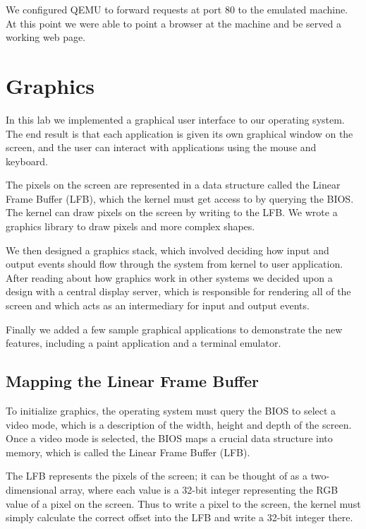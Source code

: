 \documentclass{report}
\begin{document}
We configured QEMU to forward requests at port 80 to the emulated machine. At
this point we were able to point a browser at the machine and be served a
working web page.







\chapter{Graphics}
\label{sec:graphics}

In this lab we implemented a graphical user interface to our operating system.
The end result is that each application is given its own graphical window on
the screen, and the user can interact with applications using the mouse and
keyboard.

The pixels on the screen are represented in a data structure called the Linear
Frame Buffer (LFB), which the kernel must get access to by querying the BIOS.
The kernel can draw pixels on the screen by writing to the LFB. We wrote a
graphics library to draw pixels and more complex shapes.

We then designed a graphics stack, which involved deciding how input and
output events should flow through the system from kernel to user application.
After reading about how graphics work in other systems \cite{graphicsstack,
windowingsystem, xwindowsystem} we decided upon a design with a central
display server, which is responsible for rendering all of the screen and which
acts as an intermediary for input and output events.

Finally we added a few sample graphical applications to demonstrate the new
features, including a paint application and a terminal emulator.


\section{Mapping the Linear Frame Buffer}
To initialize graphics, the operating system must query the BIOS to select a
video mode, which is a description of the width, height and depth of the
screen. Once a video mode is selected, the BIOS maps a crucial data structure
into memory, which is called the Linear Frame Buffer (LFB).

The LFB represents the pixels of the screen; it can be thought of as a
two-dimensional array, where each value is a 32-bit integer representing the
RGB value of a pixel on the screen. Thus to write a pixel to the screen, the
kernel must simply calculate the correct offset into the LFB and write a
32-bit integer there.
\end{document}
